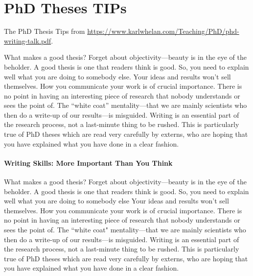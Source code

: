 \section{PhD Theses TIPs}


The PhD Thesis Tips from \url{https://www.karlwhelan.com/Teaching/PhD/phd-writing-talk.pdf}.

What makes a good thesis? Forget about objectivity—beauty is in the eye of the beholder.
A good thesis is one that readers think is good.
So, you need to explain well what you are doing to somebody else.
Your ideas and results won’t sell themselves.
How you communicate your work is of crucial importance.
There is no point in having an interesting piece of research that nobody understands or sees the point of.
The “white coat” mentality—that we are mainly scientists who then do a write-up of our results—is misguided.
Writing is an essential part of the research process, not a last-minute thing to be rushed.
This is particularly true of PhD theses which are read very carefully by externs, who are hoping that you have explained what you have done in a clear fashion.

\paragraph{Writing Skills: More Important Than You Think}
What makes a good thesis? Forget about objectivity—beauty is in the eye of the beholder.
A good thesis is one that readers think is good.
So, you need to explain well what you are doing to somebody else Your ideas and results won’t sell themselves. How you communicate your work is of crucial importance.
There is no point in having an interesting piece of research that nobody understands or sees the point of.
The  ``white coat" mentality—that we are mainly scientists who then do a write-up of our results—is misguided.
Writing is an essential part of the research process, not a last-minute thing to be rushed.
This is particularly true of PhD theses which are read very carefully by externs, who are hoping that you have explained what you have done in a clear fashion.

